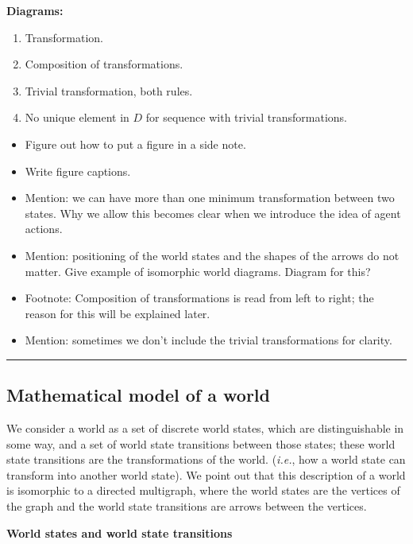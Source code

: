 \textbf{Diagrams:}
\begin{enumerate}
    \item Transformation.
    \item Composition of transformations.
    \item Trivial transformation, both rules.
    \item No unique element in $D$ for sequence with trivial transformations.
\end{enumerate}

\begin{itemize}
    \item Figure out how to put a figure in a side note.
    \item Write figure captions.

    \item Mention: we can have more than one minimum transformation between two states. Why we allow this becomes clear when we introduce the idea of agent actions.
    \item Mention: positioning of the world states and the shapes of the arrows do not matter. Give example of isomorphic world diagrams. Diagram for this?
    \item Footnote: Composition of transformations is read from left to right; the reason for this will be explained later.
    \item Mention: sometimes we don't include the trivial transformations for clarity.
\end{itemize}

\noindent\rule{\textwidth}{1mm}

\subsection{Mathematical model of a world}

We consider a world as a set of discrete world states, which are distinguishable in some way, and a set of world state transitions between those states; these world state transitions are the transformations of the world. (\textit{i.e.}, how a world state can transform into another world state).
We point out that this description of a world is isomorphic to a directed multigraph, where the world states are the vertices of the graph and the world state transitions are arrows between the vertices.

\textbf{World states and world state transitions}

